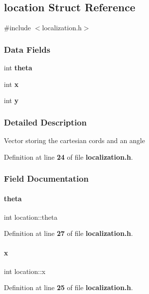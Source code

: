 \subsection{location Struct Reference}
\label{structlocation}


{\ttfamily \#include $<$localization.\+h$>$}

\subsubsection*{Data Fields}
\begin{DoxyCompactItemize}
\item 
int \textbf{ theta}
\item 
int \textbf{ x}
\item 
int \textbf{ y}
\end{DoxyCompactItemize}


\subsubsection{Detailed Description}
Vector storing the cartesian cords and an angle 

Definition at line \textbf{ 24} of file \textbf{ localization.\+h}.



\subsubsection{Field Documentation}
\mbox{\label{structlocation_a4b415222b4dcf34e49dacd22384be9eb}} 
\paragraph{theta}
{\footnotesize\ttfamily int location\+::theta}



Definition at line \textbf{ 27} of file \textbf{ localization.\+h}.

\mbox{\label{structlocation_aacd18b2506c49d221cfc37b2119e3c3c}} 
\paragraph{x}
{\footnotesize\ttfamily int location\+::x}



Definition at line \textbf{ 25} of file \textbf{ localization.\+h}.

